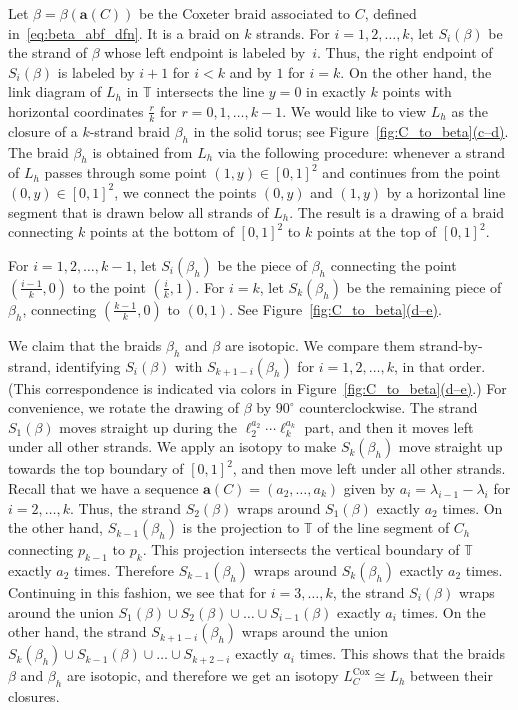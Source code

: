 \documentclass[11pt]{article}
\theoremstyle{definition}
\numberwithin{equation}{section}
\newcommand\abf{\mathbf{a}}\newcommand\bbf{\mathbf{b}}\newcommand\cbf{\mathbf{c}}\newcommand\dbf{\mathbf{d}}\newcommand\ebf{\mathbf{e}}\newcommand\fbf{\mathbf{f}}\newcommand\gbf{\mathbf{g}}\newcommand\hbf{\mathbf{h}}\newcommand\ibf{\mathbf{i}}\newcommand\jbf{\mathbf{j}}\newcommand\kbf{\mathbf{k}}\newcommand\lbf{\mathbf{l}}\newcommand\mbf{\mathbf{m}}\newcommand\nbf{\mathbf{n}}\newcommand\obf{\mathbf{o}}\newcommand\pbf{\mathbf{p}}\newcommand\qbf{\mathbf{q}}\newcommand\rbf{\mathbf{r}}\newcommand\sbf{\mathbf{s}}\newcommand\tbf{\mathbf{t}}\newcommand\ubf{\mathbf{u}}\newcommand\vbf{\mathbf{v}}\newcommand\wbf{\mathbf{w}}\newcommand\xbf{\mathbf{x}}\newcommand\ybf{\mathbf{y}}\newcommand\zbf{\mathbf{z}}
\newcommand\cox{\operatorname{Cox}}
\newcommand\Lcox{L^{\cox}}
\newcommand\T{\mathbb{T}}
\def\figref#1(#2){Figure~\hyperref[#1]{\ref*{#1}(#2)}}
\newcommand{\la}{\lambda}
\begin{document}
Let $\beta=\beta(\abf(C))$ be the Coxeter braid associated to $C$, defined in~\eqref{eq:beta_abf_dfn}. It is a braid on $k$ strands. For $i=1,2,\dots,k$, let $S_i(\beta)$ be the strand of $\beta$ whose left endpoint is labeled by~$i$. Thus, the right endpoint of $S_i(\beta)$ is labeled by $i+1$ for $i<k$ and by $1$ for $i=k$. On the other hand, the link diagram of $L_h$ in $\T$ intersects the line $y=0$ in exactly $k$ points with horizontal coordinates $\frac rk$ for $r=0,1,\dots, k-1$. We would like to view $L_h$ as the closure of a $k$-strand braid $\beta_h$ in the solid torus; see \figref{fig:C_to_beta}(c--d). The braid $\beta_h$ is obtained from $L_h$ via the following procedure: whenever a strand of $L_h$ passes through some point $(1,y)\in[0,1]^2$ and continues from the point $(0,y)\in[0,1]^2$, we connect the points $(0,y)$ and $(1,y)$ by a horizontal line segment that is drawn below all strands of $L_h$. The result is a drawing of a braid connecting $k$ points at the bottom of $[0,1]^2$ to $k$ points at the top of $[0,1]^2$. 

For $i=1,2,\dots, k-1$, let $S_i(\beta_h)$ be the piece of $\beta_h$ connecting the point $(\frac{i-1}k,0)$ to the point $(\frac ik,1)$. For $i=k$, let $S_k(\beta_h)$ be the remaining piece of $\beta_h$, connecting $(\frac{k-1}k,0)$ to $(0,1)$. See \figref{fig:C_to_beta}(d--e).

We claim that the braids $\beta_h$ and $\beta$ are isotopic. We compare them strand-by-strand, identifying $S_i(\beta)$ with $S_{k+1-i}(\beta_h)$ for $i=1,2,\dots,k$, in that order. (This correspondence is indicated via colors in \figref{fig:C_to_beta}(d--e).) For convenience, we rotate the drawing of $\beta$ by $90^\circ$ counterclockwise. The strand $S_1(\beta)$ moves straight up during the $\ell_2^{a_2}\cdots \ell_k^{a_k}$ part, and then it moves left under all other strands. We apply an isotopy to make $S_k(\beta_h)$ move straight up towards the top boundary of $[0,1]^2$, and then move left under all other strands. Recall that we have a sequence $\abf(C)=(a_2,\dots,a_k)$ given by $a_i=\la_{i-1}-\la_i$ for $i=2,\dots,k$. Thus, the strand $S_2(\beta)$ wraps around $S_1(\beta)$ exactly $a_2$ times. On the other hand, $S_{k-1}(\beta_h)$ is the projection to $\T$ of the line segment of $C_h$ connecting $p_{k-1}$ to $p_k$. This projection intersects the vertical boundary of $\T$ exactly $a_2$ times. Therefore $S_{k-1}(\beta_h)$ wraps around $S_k(\beta_h)$ exactly $a_2$ times. Continuing in this fashion, we see that for $i=3,\dots,k$, the strand $S_i(\beta)$ wraps around the union $S_1(\beta)\cup S_2(\beta)\cup\dots\cup S_{i-1}(\beta)$ exactly $a_i$ times. On the other hand, the strand $S_{k+1-i}(\beta_h)$ wraps around the union $S_k(\beta_h)\cup S_{k-1}(\beta)\cup\dots\cup S_{k+2-i}$ exactly $a_i$ times. This shows that the braids $\beta$ and $\beta_h$ are isotopic, and therefore we get an isotopy $\Lcox_C\cong L_h$ between their closures.
\end{document}
